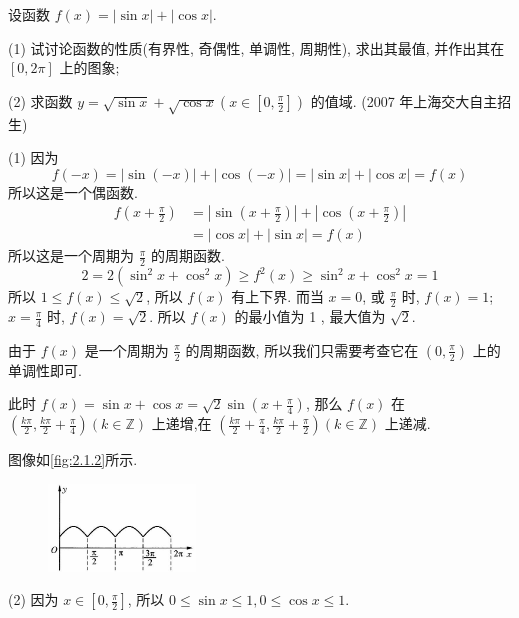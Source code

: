 \begin{example}
	设函数 $f(x)=|\sin x|+|\cos x|$.

	(1) 试讨论函数的性质(有界性, 奇偶性, 单调性, 周期性), 求出其最值, 并作出其在 $[0,2 \pi]$ 上的图象;

	(2) 求函数 $y=\sqrt{\sin x}+\sqrt{\cos x}\left(x \in\left[0, \frac{\pi}{2}\right]\right)$ 的值域. (2007 年上海交大自主招生)

\end{example}
\begin{solution}
	(1) 因为
	$$
		f(-x)=|\sin (-x)|+|\cos (-x)|=|\sin x|+|\cos x|=f(x)
	$$
	所以这是一个偶函数.
	$$
		\begin{aligned}
			f\left(x+\frac{\pi}{2}\right) & =\left|\sin \left(x+\frac{\pi}{2}\right)\right|+\left|\cos \left(x+\frac{\pi}{2}\right)\right| \\
			                              & =|\cos x|+|\sin x|=f(x)
		\end{aligned}
	$$
	所以这是一个周期为 $\frac{\pi}{2}$ 的周期函数.
	$$
		2=2\left(\sin ^{2} x+\cos ^{2} x\right) \geqslant f^{2}(x) \geqslant \sin ^{2} x+\cos ^{2} x=1
	$$
	所以 $1 \leqslant f(x) \leqslant \sqrt{2}$, 所以 $f(x)$ 有上下界. 而当 $x=0$, 或 $\frac{\pi}{2}$ 时, $f(x)=1$;\\
	$x=\frac{\pi}{4}$ 时, $f(x)=\sqrt{2}$. 所以 $f(x)$ 的最小值为 1 , 最大值为 $\sqrt{2}$.

	由于 $f(x)$ 是一个周期为 $\frac{\pi}{2}$ 的周期函数, 所以我们只需要考查它在 $\left(0, \frac{\pi}{2}\right)$ 上的单调性即可.

	此时
	$f(x)=\sin x+\cos x=\sqrt{2} \sin \left(x+\frac{\pi}{4}\right)$,
	那么 $f(x)$ 在 $\left(\frac{k \pi}{2}, \frac{k \pi}{2}+\frac{\pi}{4}\right)(k \in \mathbb{Z})$ 上递增,在 $\left(\frac{k \pi}{2}+\frac{\pi}{4}, \frac{k \pi}{2}+\frac{\pi}{2}\right)(k \in \mathbb{Z})$ 上递减.

	图像如\autoref{fig:2.1.2}所示.
	\begin{figure}[ht]
		\centering
		\includegraphics[width=0.35\textwidth]{./images/2.1.2.jpg}
		\caption{}
		\label{fig:2.1.2}
	\end{figure}

	(2) 因为 $x \in\left[0, \frac{\pi}{2}\right]$, 所以 $0 \leqslant \sin x \leqslant 1,0 \leqslant \cos x \leqslant 1$.


\end{solution}
